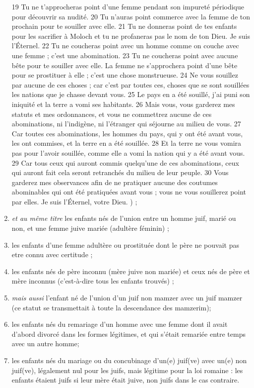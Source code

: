 \begin{enumerate}
{{19 Tu ne t'approcheras point d'une femme pendant son impureté périodique pour découvrir sa nudité.
20 Tu n'auras point commerce avec la femme de ton prochain pour te souiller avec elle.
21 Tu ne donneras point de tes enfants pour les sacrifier à Moloch et tu ne profaneras pas le nom de ton Dieu. Je suis l'Éternel.
22 Tu ne coucheras point avec un homme comme on couche avec une femme ; c'est une abomination.
23 Tu ne coucheras point avec aucune bête pour te souiller avec elle. La femme ne s'approchera point d'une bête pour se prostituer à elle ; c'est une chose monstrueuse.
24 Ne vous souillez par aucune de ces choses ; car c'est par toutes ces, choses que se sont souillées les nations que je chasse devant vous.
25 Le pays en a été souillé, j'ai puni son iniquité et la terre a vomi ses habitants.
26 Mais vous, vous garderez mes statuts et mes ordonnances, et vous ne commettrez aucune de ces abominations, ni l'indigène, ni l'étranger qui séjourne au milieu de vous.
27 Car toutes ces abominations, les hommes du pays, qui y ont été avant vous, les ont commises, et la terre en a été souillée.
28 Et la terre ne vous vomira pas pour l'avoir souillée, comme elle a vomi la nation qui y a été avant vous.
29 Car tous ceux qui auront commis quelqu'une de ces abominations, ceux qui auront fait cela seront retranchés du milieu de leur peuple.
30 Vous garderez mes observances afin de ne pratiquer aucune des coutumes abominables qui ont été pratiquées avant vous ; vous ne vous souillerez point par elles. Je suis l'Éternel, votre Dieu. }}) ;
 \item \emph{et au même titre} les enfants nés de l'union entre un homme juif, marié ou non, et une femme juive mariée (adultère féminin) ;
 \item les enfants d'une femme adultère ou prostituée dont le père ne pouvait pas etre connu avec certitude ;
 \item les enfants nés de père inconnu (mère juive non mariée) et ceux nés de père et mère inconnus (c'est-à-dire tous les enfants trouvés) ;
 \item \emph{mais aussi} l'enfant né de l'union d'un juif non mamzer avec un juif mamzer (ce statut se transmettait à toute la descendance des mamzerim);
\item les enfants nés du remariage d'un homme avec une femme dont il avait d'abord divorcé dans les formes légitimes, et qui s'était remariée entre temps avec un autre homme;
\item les enfants nés du mariage ou du concubinage d'un(e) juif(ve) avec un(e) non juif(ve), légalement nul pour les juifs, mais légitime pour la loi romaine : les enfants étaient juifs si leur mère était juive, non juifs dans le cas contraire.
\end{enumerate}

